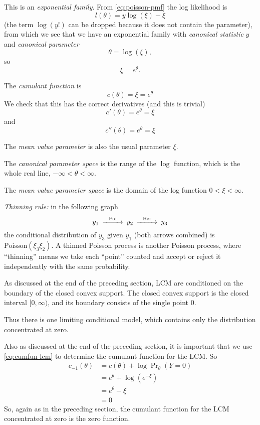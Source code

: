 This is an \emph{exponential family}.  From \eqref{eq:poisson-pmf}
the log likelihood is
$$
   l(\theta) = y \log(\xi) - \xi
$$
(the term $\log(y !)$ can be dropped because it does not contain the
parameter), from which we see that we have an exponential family with
\emph{canonical statistic} $y$ and \emph{canonical parameter}
$$
   \theta = \log(\xi),
$$
so
$$
   \xi = e^{\theta}.
$$

The \emph{cumulant function} is
$$
   c(\theta) = \xi = e^\theta
$$
We check that this has the correct derivatives (and this is trivial)
$$
   c'(\theta) = e^\theta = \xi
$$
and
$$
   c''(\theta) = e^\theta = \xi
$$

The \emph{mean value parameter} is also the usual parameter $\xi$.

The \emph{canonical parameter space} is the range of the $\log$ function,
which is the whole real line, $- \infty < \theta < \infty$.

\begin{sloppypar}
The \emph{mean value parameter space} is the domain of the log function
\mbox{$0 < \xi < \infty$}.
\end{sloppypar}

\begin{sloppypar}
\emph{Thinning rule:} in the following graph
$$
\begin{CD}
   y_1 @>\text{Poi}>> y_2 @>\text{Ber}>> y_3
\end{CD}
$$
the conditional distribution of $y_3$ given $y_1$ (both arrows combined)
is $\text{Poisson}(\xi_3 \xi_2)$.  A thinned Poisson process is another
Poisson process, where ``thinning'' means we take each ``point'' counted
and accept or reject it independently with the same probability.
\end{sloppypar}

As discussed at the end of the preceding section, LCM
are conditioned on the boundary of the closed convex support.
The closed convex support is the closed interval $[0, \infty)$, and its
boundary consists of the single point $0$.

Thus there is one limiting conditional model, which contains only
the distribution concentrated at zero.

Also as discussed at the end of the preceding section,
it is important that we use \eqref{eq:cumfun-lcm} to determine the cumulant
function for the LCM.  So
\begin{align*}
   c_{- 1}(\theta)
   & =
   c(\theta) + \log \Pr\nolimits_\theta(Y = 0)
   \\
   & =
   e^\theta 
   +
   \log (e^{- \xi})
   \\
   & =
   e^\theta 
   - \xi
   \\
   & =
   0
\end{align*}
So, again as in the preceding section, the cumulant function for the LCM
concentrated at zero is the zero function.

